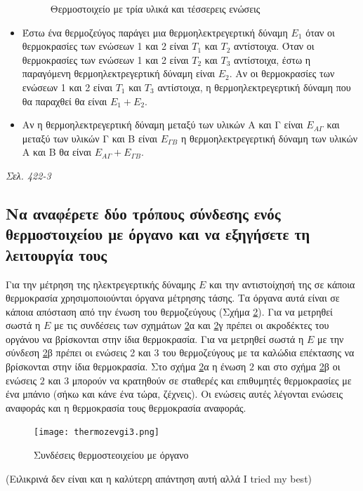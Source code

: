 \documentclass{article}
\begin{document}
\begin{itemize}
\begin{figure}[h!]
            \caption{Θερμοστοιχείο με τρία υλικά και τέσσερεις ενώσεις}
            \label{fig:7.1thermo2}
        \end{figure}
    \item Έστω ένα θερμοζεύγος παράγει μια θερμοηλεκτρεγερτική δύναμη $Ε_1$ όταν οι θερμοκρασίες των ενώσεων 1 και 2 είναι $Τ_1$ και $Τ_2$ αντίστοιχα. Όταν οι θερμοκρασίες των ενώσεων
        1 και 2 είναι $Τ_2$ και $Τ_3$ αντίστοιχα, έστω η παραγόμενη θερμοηλεκτρεγερτική δύναμη είναι $Ε_2$. Αν οι θερμοκρασίες των ενώσεων 1 και 2 είναι $Τ_1$ και $Τ_3$ αντίστοιχα, η
        θερμοηλεκτρεγερτική δύναμη που θα παραχθεί θα είναι $Ε_1+Ε_2$.
    \item Αν η θερμοηλεκτρεγερτική δύναμη μεταξύ των υλικών Α και Γ είναι $Ε_{A\Gamma}$ και μεταξύ των υλικών Γ και Β είναι $Ε_{\Gamma B}$ η θερμοηλεκτρεγερτική δύναμη των
        υλικών Α και Β θα είναι $Ε_{A\Gamma} + E_{\Gamma B}$.
\end{itemize}

\emph{Σελ. 422-3}

\subsection{Να αναφέρετε δύο τρόπους σύνδεσης ενός θερμοστοιχείου με όργανο και να εξηγήσετε τη λειτουργία τους}
Για την μέτρηση της ηλεκτρεγερτικής δύναμης $Ε$ και την αντιστοίχησή της σε κάποια θερμοκρασία χρησιμοποιούνται όργανα μέτρησης τάσης. Τα όργανα αυτά είναι σε κάποια απόσταση από την ένωση
του θερμοζεύγους (Σχήμα \ref{thermozevgi3}). Για να μετρηθεί σωστά η $Ε$ με τις συνδέσεις των σχημάτων \ref{thermozevgi3}α και \ref{thermozevgi3}γ πρέπει οι ακροδέκτες του οργάνου να 
βρίσκονται στην ίδια θερμοκρασία. Για να μετρηθεί σωστά η $Ε$ με την σύνδεση \ref{thermozevgi3}β πρέπει οι ενώσεις 2 και 3 του θερμοζεύγους με τα καλώδια επέκτασης να 
βρίσκονται στην ίδια θερμοκρασία.  Στο σχήμα \ref{thermozevgi3}α η ένωση $2$ και στο σχήμα \ref{thermozevgi3}β οι ενώσεις $2$ και $3$ μπορούν να κρατηθούν σε σταθερές 
και επιθυμητές θερμοκρασίες με ένα μπάνιο (σήκω και κάνε ένα τώρα, ζέχνεις). Οι ενώσεις αυτές λέγονται 
ενώσεις αναφοράς και η θερμοκρασία τους θερμοκρασία αναφοράς. 

\begin{figure}[h!]
    \texttt{[image: thermozevgi3.png]}
    \caption{Συνδέσεις θερμοστεοιχείου με όργανο}
    \label{thermozevgi3}
\end{figure}

(Ειλικρινά δεν είναι και η καλύτερη απάντηση αυτή αλλά \foreignlanguage{english}{I tried my best})
\end{document}
